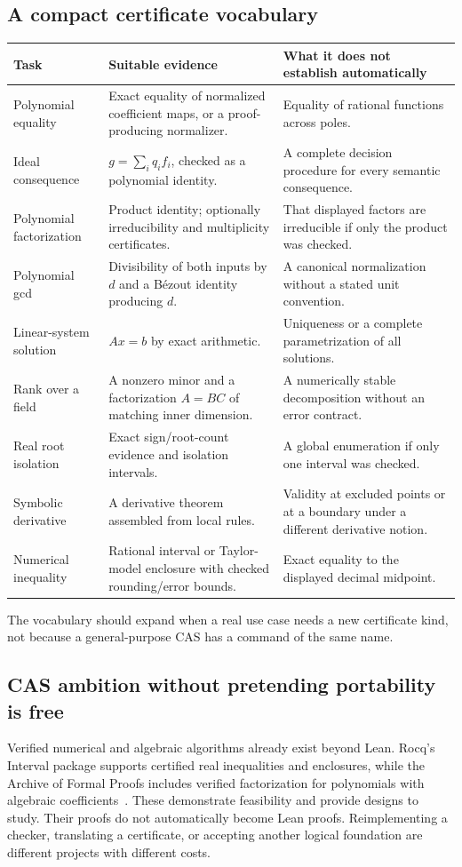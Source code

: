 \documentclass[11pt,a4paper]{article}
\theoremstyle{definition}
\theoremstyle{remark}
\begin{document}
\subsection{A compact certificate vocabulary}
\begin{longtable}{@{}P{.20\textwidth}P{.38\textwidth}P{.34\textwidth}@{}}
\toprule
Task & Suitable evidence & What it does not establish automatically\\
\midrule
\endhead
Polynomial equality & Exact equality of normalized coefficient maps, or a proof-producing normalizer. & Equality of rational functions across poles.\\
Ideal consequence & $g=\sum_i q_i f_i$, checked as a polynomial identity. & A complete decision procedure for every semantic consequence.\\
Polynomial factorization & Product identity; optionally irreducibility and multiplicity certificates. & That displayed factors are irreducible if only the product was checked.\\
Polynomial gcd & Divisibility of both inputs by $d$ and a B\'ezout identity producing $d$. & A canonical normalization without a stated unit convention.\\
Linear-system solution & $Ax=b$ by exact arithmetic. & Uniqueness or a complete parametrization of all solutions.\\
Rank over a field & A nonzero minor and a factorization $A=BC$ of matching inner dimension. & A numerically stable decomposition without an error contract.\\
Real root isolation & Exact sign/root-count evidence and isolation intervals. & A global enumeration if only one interval was checked.\\
Symbolic derivative & A derivative theorem assembled from local rules. & Validity at excluded points or at a boundary under a different derivative notion.\\
Numerical inequality & Rational interval or Taylor-model enclosure with checked rounding/error bounds. & Exact equality to the displayed decimal midpoint.\\
\bottomrule
\end{longtable}
The vocabulary should expand when a real use case needs a new certificate kind, not because a general-purpose CAS has a command of the same name.

\subsection{CAS ambition without pretending portability is free}
Verified numerical and algebraic algorithms already exist beyond Lean. Rocq's Interval package supports certified real inequalities and enclosures, while the Archive of Formal Proofs includes verified factorization for polynomials with algebraic coefficients~\cite{interval,afp}. These demonstrate feasibility and provide designs to study. Their proofs do not automatically become Lean proofs. Reimplementing a checker, translating a certificate, or accepting another logical foundation are different projects with different costs.
\end{document}

